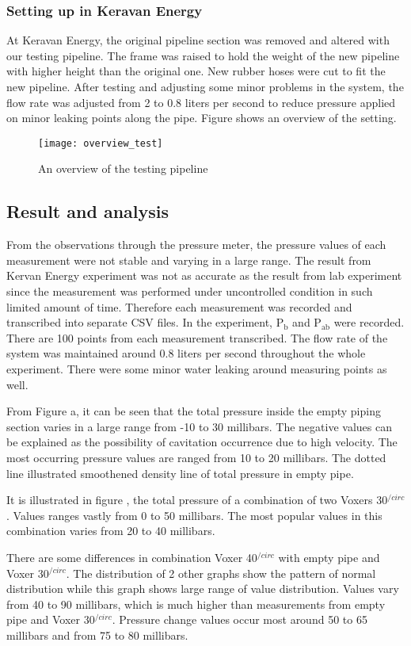 \subsubsection{Setting up in Keravan Energy}
At Keravan Energy, the original pipeline section was removed and altered with our testing pipeline. The frame was raised to hold the weight of the new pipeline with higher height than the original one. New rubber hoses were cut to fit the new pipeline. After testing and adjusting some minor problems in the system, the flow rate was adjusted from 2 to 0.8 liters per second to reduce pressure applied on minor leaking points along the pipe. Figure shows an overview of the setting.
\begin{figure}[h]
  \centering
  \texttt{[image: overview\_test]}
  \caption{ An overview of the testing pipeline}
  \label{fig:overview}
\end{figure}
\subsection{Result and analysis}
From the observations through the pressure meter, the pressure values of each measurement were not stable and varying in a large range. The result from Kervan Energy experiment was not as accurate as the result from lab experiment since the measurement was performed under uncontrolled condition in such limited amount of time. Therefore each measurement was recorded and transcribed into separate CSV files. In the experiment, P$_{\text{b}}$ and P$_{\text{ab}}$ were recorded. There are 100 points from each measurement transcribed. The flow rate of the system was maintained around 0.8 liters per second throughout the whole experiment. There were some minor water leaking around measuring points as well.

From Figure a, it can be seen that the total pressure inside the empty piping section varies in a large range from -10 to 30 millibars. The negative values can be explained as the possibility of cavitation occurrence due to high velocity. The most occurring pressure values are ranged from 10 to 20 millibars. The dotted line illustrated smoothened density line of total pressure in empty pipe. 

It is illustrated in figure , the total pressure of a combination of two Voxers 30$^{/circ}$. Values ranges vastly from 0 to 50 millibars. The most popular values in this combination varies from 20 to 40 millibars.

There are some differences in combination Voxer 40$^{/circ}$ with empty pipe and Voxer 30$^{/circ}$. The distribution of 2 other graphs show the pattern of normal distribution while this graph shows large range of value distribution. Values vary from 40 to 90 millibars, which is much higher than measurements from empty pipe and Voxer 30$^{/circ}$. Pressure change values occur most around 50 to 65 millibars and from 75 to 80 millibars. 

